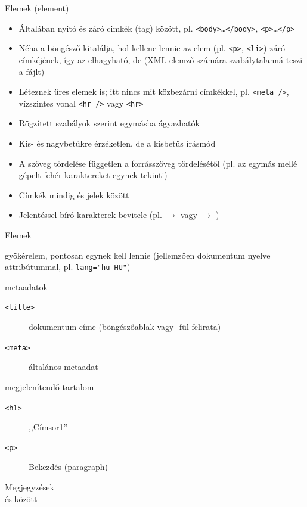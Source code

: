 \begin{frame}
  Elemek (element)
  \begin{itemize}
    \item Általában nyitó és záró cimkék (tag) között, pl. \texttt{<body>\dots</body>}, \texttt{<p>\dots</p>}
    \item Néha a böngésző kitalálja, hol kellene lennie az elem (pl. \texttt{<p>}, \texttt{<li>}) záró címkéjének, így az elhagyható, de  (XML elemző számára szabálytalanná teszi a fájlt)
    \item Léteznek üres elemek is; itt nincs mit közbezárni címkékkel, pl. \texttt{<meta />}, vízszintes vonal \texttt{<hr~/>} vagy \texttt{<hr>}
    \item Rögzített szabályok szerint egymásba ágyazhatók
    \item Kis- és nagybetűkre érzéketlen, de  a kisbetűs írásmód
    \item A szöveg tördelése független a forrásszöveg tördelésétől (pl. az egymás mellé gépelt fehér karaktereket egynek tekinti)
    \item Címkék mindig \kiemel{<} és \kiemel{>} jelek között
    \item Jelentéssel bíró karakterek bevitele  (pl. \kiemel{<} $\to$  vagy \kiemel{>} $\to$ )
  \end{itemize}
\end{frame}

\begin{frame}
  Elemek
  \begin{description}[m]
    \item[\texttt{<html>}] gyökérelem, pontosan egynek kell lennie (jellemzően dokumentum nyelve attribútummal, pl. \texttt{lang="hu-HU"})
    \item[\texttt{<head>}] metaadatok
    \begin{description}
      \item[\texttt{<title>}] dokumentum címe (böngészőablak vagy -fül felirata)
      \item[\texttt{<meta>}] általános metaadat
    \end{description}
    \item[\texttt{<body>}] megjelenítendő tartalom
    \begin{description}
      \item[\texttt{<h1>}] ,,Címsor1''
      \item[\texttt{<p>}] Bekezdés (paragraph)
    \end{description}
  \end{description}
  \vfill
  Megjegyzések\\
  \kiemel{\texttt{<!{-}-}} és \kiemel{\texttt{{-}->}} között 
\end{frame}

